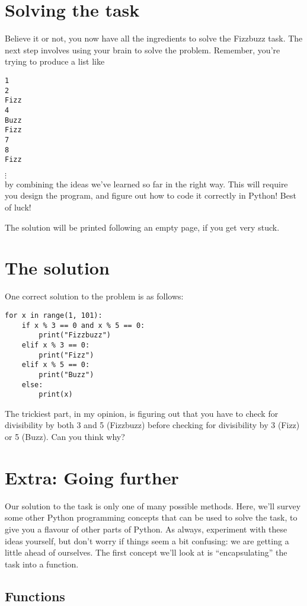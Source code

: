\documentclass[a4paper]{article}
\begin{document}
\section{Solving the task}

Believe it or not, you now have all the ingredients to solve the Fizzbuzz task. The next step involves using your brain to solve the problem. Remember, you're trying to produce a list like
\begin{lstlisting}
1
2
Fizz
4
Buzz
Fizz
7
8
Fizz
\end{lstlisting}
$\vdots$\\
\noindent by combining the ideas we've learned so far in the right way. This will require you design the program, and figure out how to code it correctly in Python! Best of luck!

The solution will be printed following an empty page, if you get very stuck.

\pagebreak
\pagebreak

\section{The solution}

One correct solution to the problem is as follows:
\begin{lstlisting}
for x in range(1, 101):
    if x % 3 == 0 and x % 5 == 0:
        print("Fizzbuzz")
    elif x % 3 == 0:
        print("Fizz")
    elif x % 5 == 0:
        print("Buzz")
    else:
        print(x)
\end{lstlisting}
The trickiest part, in my opinion, is figuring out that you have to check for divisibility by both 3 and 5 (Fizzbuzz) before checking for divisibility by 3 (Fizz) or 5 (Buzz). Can you think why?

\section{Extra: Going further}

Our solution to the task is only one of many possible methods. Here, we'll survey some other Python programming concepts that can be used to solve the task, to give you a flavour of other parts of Python. As always, experiment with these ideas yourself, but don't worry if things seem a bit confusing: we are getting a little ahead of ourselves. The first concept we'll look at is ``encapsulating'' the task into a function.

\subsection{Functions}
\end{document}
